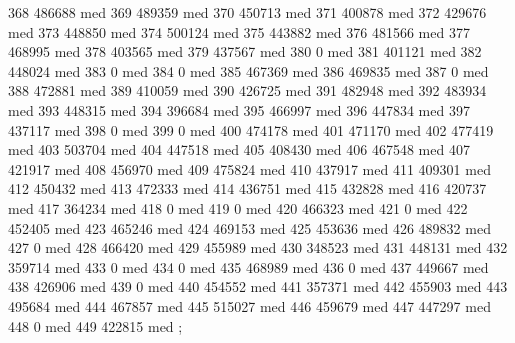 {368 486688 med
369 489359 med
370 450713 med
371 400878 med
372 429676 med
373 448850 med
374 500124 med
375 443882 med
376 481566 med
377 468995 med
378 403565 med
379 437567 med
380 0 med
381 401121 med
382 448024 med
383 0 med
384 0 med
385 467369 med
386 469835 med
387 0 med
388 472881 med
389 410059 med
390 426725 med
391 482948 med
392 483934 med
393 448315 med
394 396684 med
395 466997 med
396 447834 med
397 437117 med
398 0 med
399 0 med
400 474178 med
401 471170 med
402 477419 med
403 503704 med
404 447518 med
405 408430 med
406 467548 med
407 421917 med
408 456970 med
409 475824 med
410 437917 med
411 409301 med
412 450432 med
413 472333 med
414 436751 med
415 432828 med
416 420737 med
417 364234 med
418 0 med
419 0 med
420 466323 med
421 0 med
422 452405 med
423 465246 med
424 469153 med
425 453636 med
426 489832 med
427 0 med
428 466420 med
429 455989 med
430 348523 med
431 448131 med
432 359714 med
433 0 med
434 0 med
435 468989 med
436 0 med
437 449667 med
438 426906 med
439 0 med
440 454552 med
441 357371 med
442 455903 med
443 495684 med
444 467857 med
445 515027 med
446 459679 med
447 447297 med
448 0 med
449 422815 med
};
